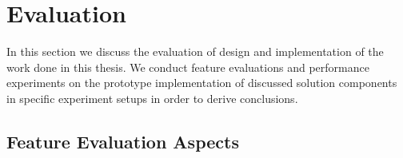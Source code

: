 
\chapter{Evaluation} %
\label{Chapter5} %

In this section we discuss the evaluation of design and implementation of the work done in this thesis. We conduct feature evaluations and performance experiments on the prototype implementation of discussed solution components in specific experiment setups in order to derive conclusions.
\section{Feature Evaluation Aspects}
